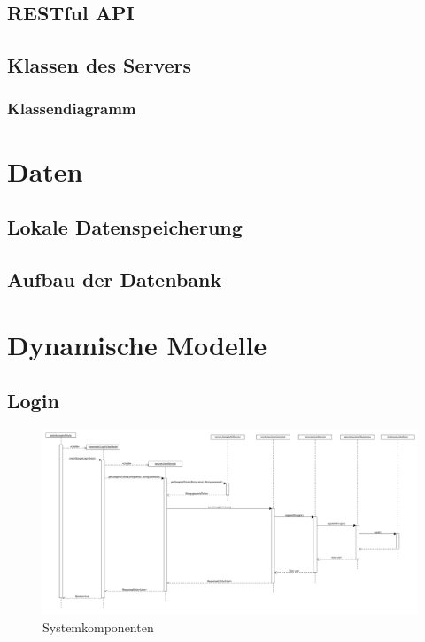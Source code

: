 \documentclass[a4paper]{scrreprt}
\begin{document}
	\clearpage
	
	\clearpage
	
	\clearpage
	
	\clearpage
	\section{RESTful API}
	
	\clearpage
	\section{Klassen des Servers}
		\subsection{Klassendiagramm}

	
 

\chapter{Daten}
	\section{Lokale Datenspeicherung}
	\section{Aufbau der Datenbank}

\chapter{Dynamische Modelle}
		\section{Login}
		 \begin{figure}[H]
	       \centering
	       \includegraphics[scale = .15]{login_sequenzdiagramm.png}
	       \caption{Systemkomponenten}
	      \end{figure}
	 
\end{document}
